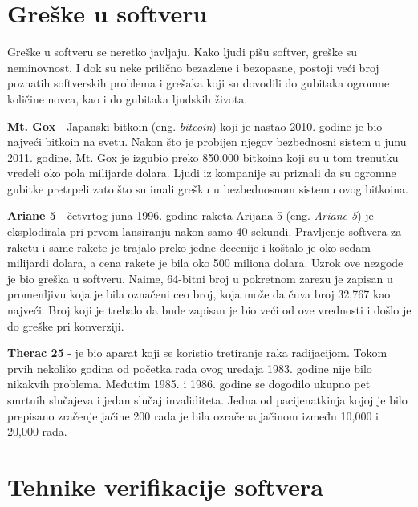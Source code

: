 \documentclass[12pt,oneside]{memoir}
\begin{document}
\section{Greške u softveru} \label{sct:greske}
Greške u softveru se neretko javljaju. Kako ljudi pišu softver, greške su neminovnost. I dok su neke prilično bezazlene i bezopasne, postoji veći broj poznatih softverskih problema i grešaka koji su dovodili do gubitaka ogromne količine novca, kao i do gubitaka ljudskih života.

\begin{description}

    \item \textbf{Mt. Gox} \cite{software_erros} - Japanski bitkoin (eng. \textit{bitcoin}) koji je nastao 2010. godine je bio najveći bitkoin na svetu. Nakon što je probijen njegov bezbednosni sistem u junu 2011. godine, Mt. Gox je izgubio preko 850,000 bitkoina koji su u tom trenutku vredeli oko pola milijarde dolara. Ljudi iz kompanije su priznali da su ogromne gubitke pretrpeli zato što su imali grešku u bezbednosnom sistemu ovog bitkoina.
    
    \item \textbf{Ariane 5} \cite{arriane_5} - četvrtog juna 1996. godine raketa Arijana 5 (eng. \textit{Ariane 5}) je eksplodirala pri prvom lansiranju nakon samo 40 sekundi. Pravljenje softvera za raketu i same rakete je trajalo preko jedne decenije i koštalo je oko sedam milijardi dolara, a cena rakete je bila oko 500 miliona dolara. Uzrok ove nezgode je bio greška u softveru. Naime, 64-bitni broj u pokretnom zarezu je zapisan u promenljivu koja je bila označeni ceo broj, koja može da čuva broj 32,767 kao najveći. Broj koji je trebalo da bude zapisan je bio veći od ove vrednosti i došlo je do greške pri konverziji.
    
    \item \textbf{Therac 25} \cite{therac_25} - je bio aparat koji se koristio tretiranje raka radijacijom. Tokom prvih nekoliko godina od početka rada ovog uređaja 1983. godine nije bilo nikakvih problema. Međutim 1985. i 1986. godine se dogodilo ukupno pet smrtnih slučajeva i jedan slučaj invaliditeta. Jedna od pacijenatkinja kojoj je bilo prepisano zračenje jačine 200 rada je bila ozračena jačinom između 10,000 i 20,000 rada.  

\end{description}

\section{Tehnike verifikacije softvera} \label{sct:tehnike}
\end{document}
